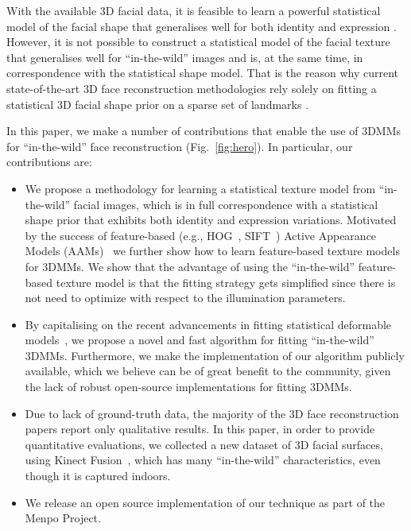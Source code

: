 With the available 3D facial data, it is feasible to learn a powerful statistical model of the facial shape that generalises well for both identity and expression \cite{cao2014facewarehouse,paysan20093d,booth3d}.
However, it is not possible to construct a statistical model of the facial texture that
generalises well for ``in-the-wild'' images and is, at the same time, in
correspondence with the statistical shape model.
That is the reason why current state-of-the-art 3D face reconstruction
methodologies rely solely on fitting a statistical 3D facial shape prior on a
sparse set of landmarks \cite{aldrian2013inverse,huber2015fitting}.

In this paper, we make a number of contributions that enable the use of 3DMMs for ``in-the-wild'' face reconstruction (Fig.~\ref{fig:hero}). In particular, our contributions are:

\begin{itemize}

\item We propose a methodology for learning a statistical texture model from ``in-the-wild'' facial images, which
is in full correspondence with a statistical shape prior that exhibits both
identity and expression variations.
Motivated by the success of feature-based
(e.g., HOG~\cite{dalal2005histograms}, SIFT~\cite{lowe1999object})
Active Appearance Models (AAMs)~\cite{antonakos2014hog,antonakos2015feature}
we further show how to learn feature-based texture models for 3DMMs.
We show that the advantage of using the ``in-the-wild'' feature-based texture model is that the fitting strategy gets simplified since there is not need to optimize with respect to the illumination parameters.

\item By capitalising on the recent advancements in fitting statistical
deformable models~\cite{papandreou2008adaptive,tzimiropoulos2013optimization,antonakos2015feature,alabort2016unified},
we propose a novel and fast algorithm for fitting ``in-the-wild'' 3DMMs. Furthermore, we make the
implementation of our algorithm publicly available, which we believe can be of
great benefit to the community, given the lack of robust open-source implementations for fitting 3DMMs.

\item Due to lack of ground-truth data, the majority of the 3D face
reconstruction papers report only qualitative results. In this paper, in order
to provide quantitative evaluations, we collected a new dataset of 3D facial surfaces, using Kinect Fusion~\cite{izadi2011kinectfusion,newcombe2011kinectfusion}, which has many ``in-the-wild'' characteristics, even though it is captured indoors.

\item We release an open source implementation of our technique as part of the Menpo Project.~\cite{menpo14}

\end{itemize}

